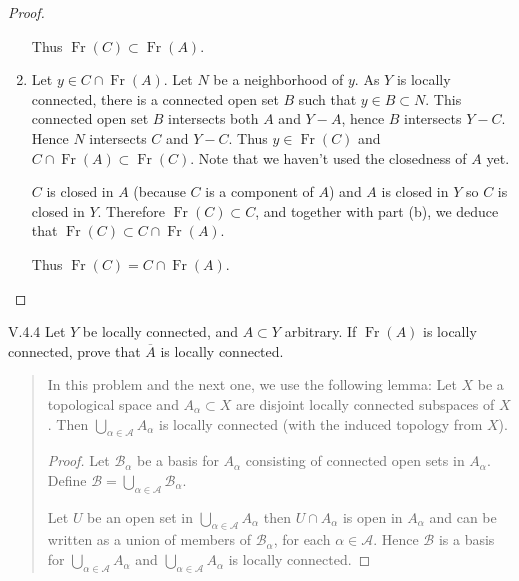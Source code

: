 \begin{proof}
\begin{enumerate}[label={(\alph*)}]
		      Thus \( \operatorname{Fr}(C) \subset \operatorname{Fr}(A) \).
		\item Let \( y \in C \cap \operatorname{Fr}(A) \). Let \( N \) be a neighborhood of \( y \). As \( Y \) is locally connected, there is a connected open set \( B \) such that \( y \in B \subset N \). This connected open set \( B \) intersects both \( A \) and \( Y - A \), hence \( B \) intersects \( Y - C \). Hence \( N \) intersects \( C \) and \( Y - C \). Thus \( y \in \operatorname{Fr}(C) \) and \( C \cap \operatorname{Fr}(A) \subset \operatorname{Fr}(C) \). Note that we haven't used the closedness of \(A\) yet.

		      \( C \) is closed in \( A \) (because \(C\) is a component of \(A\)) and \( A \) is closed in \( Y \) so \( C \) is closed in \( Y \). Therefore \( \operatorname{Fr}(C) \subset C \), and together with part (b), we deduce that \( \operatorname{Fr}(C) \subset C \cap \operatorname{Fr}(A) \).

		      Thus \( \operatorname{Fr}(C) = C \cap \operatorname{Fr}(A) \).
	\end{enumerate}
\end{proof}

\begin{problem}{V.4.4}
Let \( Y \) be locally connected, and \( A \subset Y \) arbitrary. If \(\operatorname{Fr}(A)\) is locally connected, prove that \( \overline{A} \) is locally connected.
\end{problem}

\begin{quotation}
	In this problem and the next one, we use the following lemma: Let \( X \) be a topological space and \( A_{\alpha} \subset X \) are disjoint locally connected subspaces of \( X \). Then \( \bigcup_{\alpha\in\mathscr{A}} A_{\alpha} \) is locally connected (with the induced topology from \( X \)).

	\begin{proof}
		Let \( \mathscr{B}_{\alpha} \) be a basis for \( A_{\alpha} \) consisting of connected open sets in \( A_{\alpha} \). Define \( \mathscr{B} = \bigcup_{\alpha\in\mathscr{A}} \mathscr{B}_{\alpha} \).

		Let \( U \) be an open set in \( \bigcup_{\alpha\in\mathscr{A}} A_{\alpha} \) then \( U \cap A_{\alpha} \) is open in \( A_{\alpha} \) and can be written as a union of members of \( \mathscr{B}_{\alpha} \), for each \( \alpha \in \mathscr{A} \). Hence \( \mathscr{B} \) is a basis for \( \bigcup_{\alpha\in\mathscr{A}} A_{\alpha} \) and \( \bigcup_{\alpha\in\mathscr{A}} A_{\alpha} \) is locally connected.
	\end{proof}
\end{quotation}

